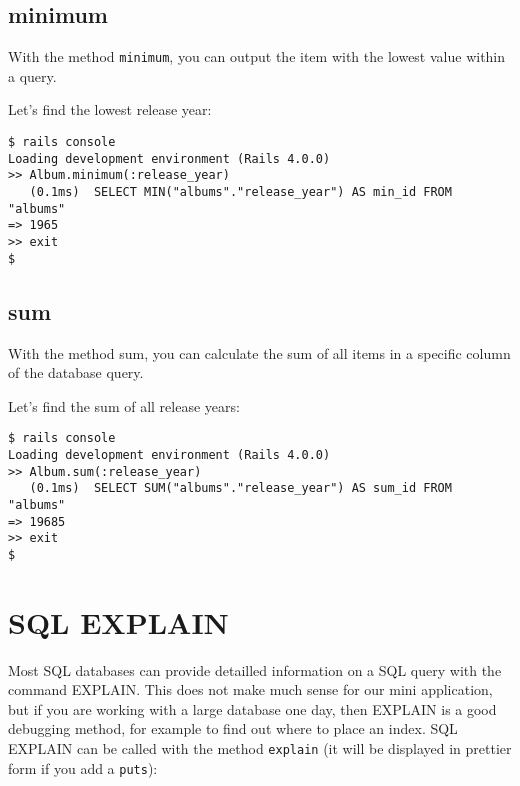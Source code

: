 \documentclass[a4paper]{book}
\newcounter{tab}[chapter]
\begin{document}
\subsection{minimum}\label{minimum}

With the method \texttt{minimum}, you can output the item with the lowest value within a query.

Let's find the lowest release year:

\begin{shaded}\begin{verbatim}
$ rails console
Loading development environment (Rails 4.0.0)
>> Album.minimum(:release_year)
   (0.1ms)  SELECT MIN("albums"."release_year") AS min_id FROM "albums"
=> 1965
>> exit
$
\end{verbatim}\end{shaded}

\subsection{sum}\label{sum}

With the method sum, you can calculate the sum of all items in a specific column of the database query.

Let's find the sum of all release years:

\begin{shaded}\begin{verbatim}
$ rails console
Loading development environment (Rails 4.0.0)
>> Album.sum(:release_year)
   (0.1ms)  SELECT SUM("albums"."release_year") AS sum_id FROM "albums"
=> 19685
>> exit
$
\end{verbatim}\end{shaded}

\section{SQL EXPLAIN}\label{sql-explain}

Most SQL databases can provide detailled information on a SQL query with the command EXPLAIN. This does not make much sense for our mini application, but if you are working with a large database one day, then EXPLAIN is a good debugging method, for example to find out where to place an index. SQL EXPLAIN can be called with the method \texttt{explain} (it will be displayed in prettier form if you add a \texttt{puts}):
\end{document}
